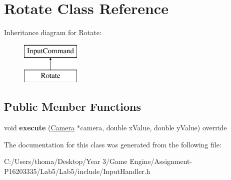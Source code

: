 \hypertarget{class_rotate}{}\section{Rotate Class Reference}
\label{class_rotate}
Inheritance diagram for Rotate\+:\begin{figure}[H]
\begin{center}
\leavevmode
\includegraphics[height=2.000000cm]{class_rotate}
\end{center}
\end{figure}
\subsection*{Public Member Functions}
\begin{DoxyCompactItemize}
\item 
\mbox{\label{class_rotate_a799fb6c4b0f70a902d58f0bb1ae4c934}} 
void {\bfseries execute} (\mbox{\hyperlink{class_camera}{Camera}} $\ast$camera, double x\+Value, double y\+Value) override
\end{DoxyCompactItemize}


The documentation for this class was generated from the following file\+:\begin{DoxyCompactItemize}
\item 
C\+:/\+Users/thoma/\+Desktop/\+Year 3/\+Game Engine/\+Assignment-\/\+P16203335/\+Lab5/\+Lab5/include/Input\+Handler.\+h\end{DoxyCompactItemize}
